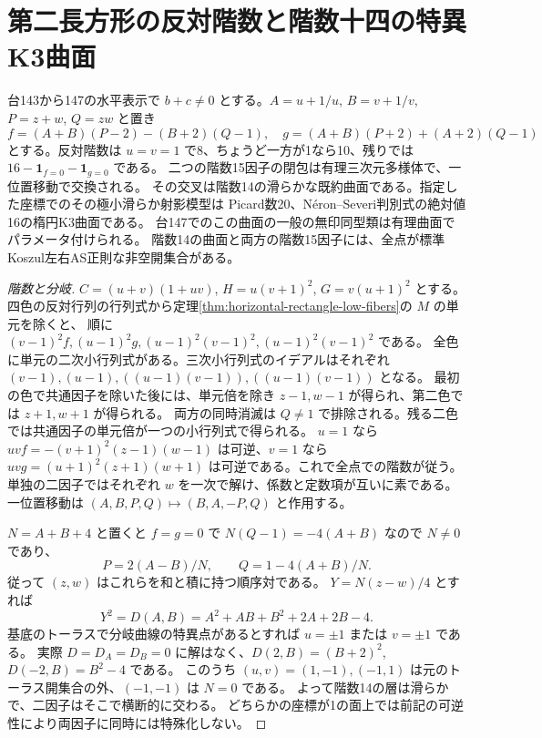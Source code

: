 \section{第二長方形の反対階数と階数十四の特異K3曲面}
\label{sec:second-rectangle-opposite-ranks}
\begin{theorem}\label{thm:second-rectangle-opposite-ranks}
台143から147の水平表示で $b+c\ne0$ とする。$A=u+1/u$, $B=v+1/v$, $P=z+w$, $Q=zw$ と置き
\[
 f=(A+B)(P-2)-(B+2)(Q-1),\quad
 g=(A+B)(P+2)+(A+2)(Q-1)
\]
とする。反対階数は $u=v=1$ で8、ちょうど一方が1なら10、残りでは
$16-\mathbf1_{f=0}-\mathbf1_{g=0}$ である。
二つの階数15因子の閉包は有理三次元多様体で、一位置移動で交換される。
その交叉は階数14の滑らかな既約曲面である。指定した座標でのその極小滑らか射影模型は
Picard数20、Néron--Severi判別式の絶対値16の楕円K3曲面である。
台147でのこの曲面の一般の無印同型類は有理曲面でパラメータ付けられる。
階数14の曲面と両方の階数15因子には、全点が標準Koszul左右AS正則な非空開集合がある。
\end{theorem}

\begin{proof}[階数と分岐]
$C=(u+v)(1+uv)$, $H=u(v+1)^2$, $G=v(u+1)^2$ とする。
四色の反対行列の行列式から定理\ref{thm:horizontal-rectangle-low-fibers}の $M$ の単元を除くと、
順に $(v-1)^2f,(u-1)^2g,(u-1)^2(v-1)^2,(u-1)^2(v-1)^2$ である。
全色に単元の二次小行列式がある。三次小行列式のイデアルはそれぞれ
$(v-1),(u-1),((u-1)(v-1)),((u-1)(v-1))$ となる。
最初の色で共通因子を除いた後には、単元倍を除き $z-1,w-1$ が得られ、第二色では $z+1,w+1$ が得られる。
両方の同時消滅は $Q\ne1$ で排除される。残る二色では共通因子の単元倍が一つの小行列式で得られる。
$u=1$ なら $uv f=-(v+1)^2(z-1)(w-1)$ は可逆、$v=1$ なら
$uv g=(u+1)^2(z+1)(w+1)$ は可逆である。これで全点での階数が従う。
単独の二因子ではそれぞれ $w$ を一次で解け、係数と定数項が互いに素である。
一位置移動は $(A,B,P,Q)\mapsto(B,A,-P,Q)$ と作用する。

$N=A+B+4$ と置くと $f=g=0$ で $N(Q-1)=-4(A+B)$ なので $N\ne0$ であり、
\[
 P=2(A-B)/N,\qquad Q=1-4(A+B)/N .
\]
従って $(z,w)$ はこれらを和と積に持つ順序対である。
$Y=N(z-w)/4$ とすれば
\[
 Y^2=D(A,B)=A^2+AB+B^2+2A+2B-4.
\]
基底のトーラスで分岐曲線の特異点があるとすれば $u=\pm1$ または $v=\pm1$ である。
実際 $D=D_A=D_B=0$ に解はなく、$D(2,B)=(B+2)^2$, $D(-2,B)=B^2-4$ である。
このうち $(u,v)=(1,-1),(-1,1)$ は元のトーラス開集合の外、$(-1,-1)$ は $N=0$ である。
よって階数14の層は滑らかで、二因子はそこで横断的に交わる。
どちらかの座標が1の面上では前記の可逆性により両因子に同時には特殊化しない。
\end{proof}

